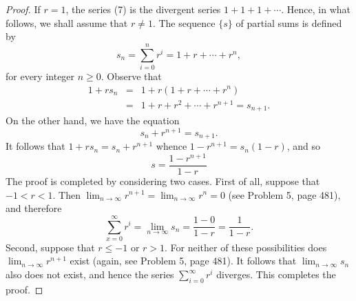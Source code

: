 \begin{proof}
If $r = 1$, the series (7) is the divergent series $1 + 1 + 1 + \cdots $. Hence, in what follows, we shall assume that $r \neq 1$. The sequence $\{ s \}$ of partial sums is defined by
$$
s_n = \sum_{i=0}^n r^i = 1 + r+ \cdots + r^n,
$$
for every integer $n \geq 0$. Observe that
\begin{eqnarray*}
1 + rs_n &=& 1 + r(1 + r + \cdots + r^n) \\
              &=& 1 + r + r^2 + \cdots + r^{n+1} = s_{n+1}.
\end{eqnarray*}
On the other hand, we have the equation
$$
s_n + r^{n + 1} = s_{n +1}. 
$$
It follows that $1 + rs_n = s_n + r^{n+1}$ whence $1 - r^{n+1} = s_n(1 - r)$, and so
$$
s = \frac{1 - r^{n + 1}}{1 - r}
$$
The proof is completed by considering two cases. First of all, suppose that $-1 < r < 1$. Then $\lim_{n \rightarrow \infty} r^{n+1} = \lim_{n \rightarrow \infty} r^n = 0$ (see Problem 5, page 481), and therefore
$$
\sum_{x=0}^\infty r^i = \lim_{n \rightarrow \infty} s_n = \frac{1 - 0}{1 - r } = \frac{1}{1 - r} . 
$$
\noindent Second, suppose that $r \leq - 1$ or $r > 1$. For neither of these possibilities does $\lim_{n \rightarrow \infty} r^{n+1}$ exist (again, see Problem 5, page 481). It follows that $\lim_{n \rightarrow \infty} s_n$ also does not exist, and hence the series $\sum_{i=0}^\infty r^i$ diverges. This completes the proof.
\end{proof}

